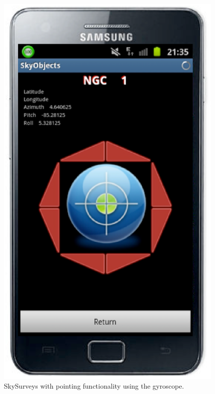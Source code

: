\begin{figure}[ht]
\includegraphics[scale=0.28]{part5/Schaaff_O28/O28_f6.eps}
\caption{SkySurveys with pointing functionality using the gyroscope.} 
\label{O28:3}
\end{figure}

